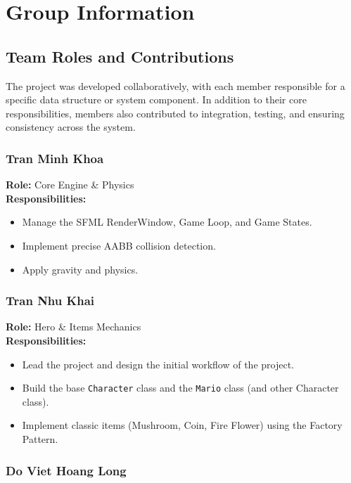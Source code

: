 \section{Group Information}
\subsection{Team Roles and Contributions}

The project was developed collaboratively, with each member responsible for a specific data structure or system component. In addition to their core responsibilities, members also contributed to integration, testing, and ensuring consistency across the system.

\subsubsection{Tran Minh Khoa}

\textbf{Role:} Core Engine \& Physics \\
\textbf{Responsibilities:}
\begin{itemize}
    \item Manage the SFML RenderWindow, Game Loop, and Game States.
    \item Implement precise AABB collision detection.
    \item Apply gravity and physics.
\end{itemize}

\subsubsection{Tran Nhu Khai}

\textbf{Role:} Hero \& Items Mechanics \\
\textbf{Responsibilities:}
\begin{itemize}
    \item Lead the project and design the initial workflow of the project.
    \item Build the base \texttt{Character} class and the \texttt{Mario} class (and other Character class).
    \item Implement classic items (Mushroom, Coin, Fire Flower) using the Factory Pattern.
\end{itemize}

\subsubsection{Do Viet Hoang Long}

